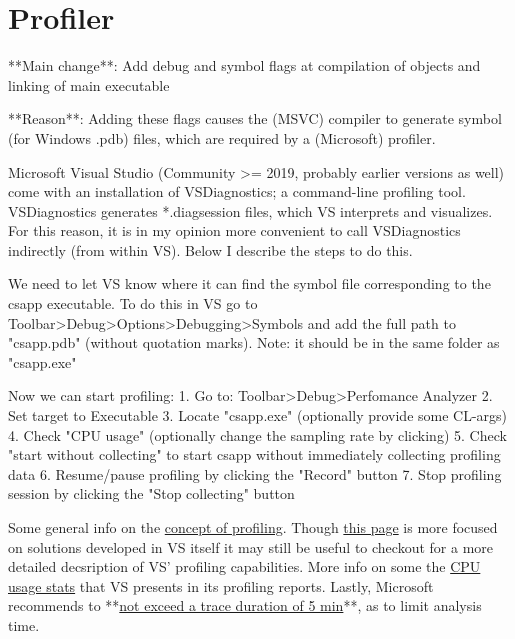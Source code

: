\section{Profiler} \label{sec:profiler}
**Main change**: Add debug and symbol flags at compilation of objects and linking of main executable

**Reason**: Adding these flags causes the (MSVC) compiler to generate symbol (for Windows .pdb) files, which are required by a (Microsoft) profiler.

Microsoft Visual Studio (Community >= 2019, probably earlier versions as well) come with an installation of VSDiagnostics; a command-line profiling tool. VSDiagnostics generates *.diagsession files, which VS interprets and visualizes. For this reason, it is in my opinion more convenient to call VSDiagnostics indirectly (from within VS). Below I describe the steps to do this.

We need to let VS know where it can find the symbol file corresponding to the csapp executable. To do this in VS go to Toolbar>Debug>Options>Debugging>Symbols and add the full path to "csapp.pdb" (without quotation marks). Note: it should be in the same folder as "csapp.exe"

Now we can start profiling:
1. Go to: Toolbar>Debug>Perfomance Analyzer
2. Set target to Executable
3. Locate "csapp.exe" (optionally provide some CL-args)
4. Check "CPU usage" (optionally change the sampling rate by clicking) %
5. Check "start without collecting" to start csapp without immediately collecting profiling data
6. Resume/pause profiling by clicking the "Record" button
7. Stop profiling session by clicking the "Stop collecting" button

Some general info on the \href{https://learn.microsoft.com/en-us/visualstudio/profiling/understanding-performance-collection-methods-perf-profiler?view=vs-2022}{concept of profiling}. Though \href{https://learn.microsoft.com/en-us/visualstudio/profiling/profiling-feature-tour?view=vs-2022}{this page} is more focused on solutions developed in VS itself it may still be useful to checkout for a more detailed decsription of VS' profiling capabilities. More info on some the \href{https://learn.microsoft.com/en-us/visualstudio/profiling/cpu-usage?view=vs-2022&source=recommendations#BKMK_Call_tree_data_columns}{CPU usage stats} that VS presents in its profiling reports. Lastly, Microsoft recommends to **\href{https://learn.microsoft.com/en-us/visualstudio/profiling/optimize-profiler-settings?view=vs-2022#trace-duration}{not exceed a trace duration of 5 min}**, as to limit analysis time.

